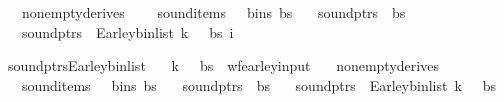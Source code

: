 \begin{isabellebody}
\ \ \ {\isachardoublequoteopen}nonempty{\isacharunderscore}{\kern0pt}derives\ {\isasymG}{\isachardoublequoteclose}\isanewline
\ \ \ {\isachardoublequoteopen}sound{\isacharunderscore}{\kern0pt}items\ {\isasymG}\ {\isasymomega}\ {\isacharparenleft}{\kern0pt}bins\ bs{\isacharparenright}{\kern0pt}{\isachardoublequoteclose}\isanewline
\ \ \ {\isachardoublequoteopen}sound{\isacharunderscore}{\kern0pt}ptrs\ {\isasymomega}\ bs{\isachardoublequoteclose}\ \isanewline
\ \ \ {\isachardoublequoteopen}sound{\isacharunderscore}{\kern0pt}ptrs\ {\isasymomega}\ {\isacharparenleft}{\kern0pt}Earley{\isacharunderscore}{\kern0pt}bin{\isacharunderscore}{\kern0pt}list{\isacharprime}{\kern0pt}\ k\ {\isasymG}\ {\isasymomega}\ bs\ i{\isacharparenright}{\kern0pt}{\isachardoublequoteclose}%
\isadelimproof
%
\endisadelimproof
%
\isatagproof
%
\endisatagproof
{\isafoldproof}%
%
\isadelimproof
%
\endisadelimproof
%
\begin{isamarkuptext}%
%
\end{isamarkuptext}\isamarkuptrue%
\isamarkupfalse%
\ sound{\isacharunderscore}{\kern0pt}ptrs{\isacharunderscore}{\kern0pt}Earley{\isacharunderscore}{\kern0pt}bin{\isacharunderscore}{\kern0pt}list{\isacharcolon}{\kern0pt}\isanewline
\ \ \ {\isachardoublequoteopen}{\isacharparenleft}{\kern0pt}k{\isacharcomma}{\kern0pt}\ {\isasymG}{\isacharcomma}{\kern0pt}\ {\isasymomega}{\isacharcomma}{\kern0pt}\ bs{\isacharparenright}{\kern0pt}\ {\isasymin}\ wf{\isacharunderscore}{\kern0pt}earley{\isacharunderscore}{\kern0pt}input{\isachardoublequoteclose}\isanewline
\ \ \ {\isachardoublequoteopen}nonempty{\isacharunderscore}{\kern0pt}derives\ {\isasymG}{\isachardoublequoteclose}\isanewline
\ \ \ {\isachardoublequoteopen}sound{\isacharunderscore}{\kern0pt}items\ {\isasymG}\ {\isasymomega}\ {\isacharparenleft}{\kern0pt}bins\ bs{\isacharparenright}{\kern0pt}{\isachardoublequoteclose}\isanewline
\ \ \ {\isachardoublequoteopen}sound{\isacharunderscore}{\kern0pt}ptrs\ {\isasymomega}\ bs{\isachardoublequoteclose}\isanewline
\ \ \ {\isachardoublequoteopen}sound{\isacharunderscore}{\kern0pt}ptrs\ {\isasymomega}\ {\isacharparenleft}{\kern0pt}Earley{\isacharunderscore}{\kern0pt}bin{\isacharunderscore}{\kern0pt}list\ k\ {\isasymG}\ {\isasymomega}\ bs{\isacharparenright}{\kern0pt}{\isachardoublequoteclose}%
\isadelimproof
%
\endisadelimproof
%
\isatagproof
%
\endisatagproof
{\isafoldproof}%
%
\isadelimproof
%

\end{isabellebody}
